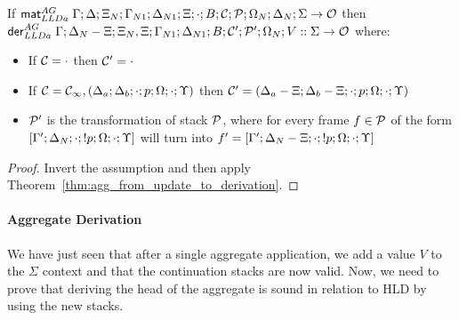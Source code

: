 \begin{corollary}\label{thm:agg_match_to_derivation}
If $\mathsf{mat}_{LLDa}^{AG} \; \Gamma; \Delta; \Xi_N; \Gamma_{N1}; \Delta_{N1}; \Xi; \cdot; B;
\mathcal{C}; \mathcal{P};
\Omega_N; \Delta_N; \Sigma \rightarrow \mathcal{O}$ then\\
$\mathsf{der}_{LLDa}^{AG} \; \Gamma; \Delta_N - \Xi; \Xi_N, \Xi; \Gamma_{N1}; \Delta_{N1}; B; \mathcal{C'};
\mathcal{P'}; \Omega_N; V :: \Sigma \rightarrow \mathcal{O}$ where:
   
\begin{itemize}[leftmargin=*]
   \item If $\mathcal{C} = \cdot$ then $\mathcal{C'} = \cdot$
   \item If $\mathcal{C} = \mathcal{C_1}, (\Delta_a; \Delta_b; \cdot; p; \Omega;
         \cdot; \Upsilon)$ then $\mathcal{C'} = (\Delta_a - \Xi; \Delta_b - \Xi; \cdot; p;
            \Omega; \cdot; \Upsilon)$
   \item $\mathcal{P'}$ is the transformation of stack $\mathcal{P}$, where for every frame $f \in
   \mathcal{P}$ of the form $[\Gamma'; \Delta_N; \cdot; {!} p; \Omega; \cdot; \Upsilon]$
   will turn into $f' = [\Gamma';\Delta_N-\Xi;\cdot;{!} p;\Omega;\cdot;\Upsilon]$
\end{itemize}
\end{corollary}

\begin{proof}
Invert the assumption and then apply Theorem~\ref{thm:agg_from_update_to_derivation}.
\end{proof}


\paragraph{Aggregate Derivation}

We have just seen that after a single aggregate application, we add a value $V$
to the $\Sigma$ context and that the continuation stacks are now valid.
Now, we need to prove that deriving the head of the
aggregate is sound in relation to HLD by using the new stacks.

